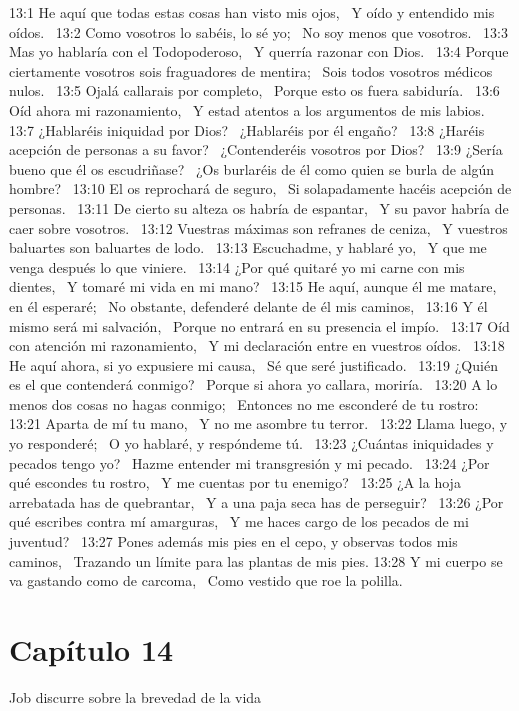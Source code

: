 13:1 He aquí que todas estas cosas han visto mis ojos,  
Y oído y entendido mis oídos.  
13:2 Como vosotros lo sabéis, lo sé yo;  
No soy menos que vosotros.  
13:3 Mas yo hablaría con el Todopoderoso,  
Y querría razonar con Dios.  
13:4 Porque ciertamente vosotros sois fraguadores de mentira;  
Sois todos vosotros médicos nulos.  
13:5 Ojalá callarais por completo,  
Porque esto os fuera sabiduría.  
13:6 Oíd ahora mi razonamiento,  
Y estad atentos a los argumentos de mis labios. 
13:7 ¿Hablaréis iniquidad por Dios?  
¿Hablaréis por él engaño?  
13:8 ¿Haréis acepción de personas a su favor?  
¿Contenderéis vosotros por Dios?  
13:9 ¿Sería bueno que él os escudriñase?  
¿Os burlaréis de él como quien se burla de algún hombre?  
13:10 El os reprochará de seguro,  
Si solapadamente hacéis acepción de personas.  
13:11 De cierto su alteza os habría de espantar,  
Y su pavor habría de caer sobre vosotros.  
13:12 Vuestras máximas son refranes de ceniza,  
Y vuestros baluartes son baluartes de lodo.  
13:13 Escuchadme, y hablaré yo,  
Y que me venga después lo que viniere.  
13:14 ¿Por qué quitaré yo mi carne con mis dientes,  
Y tomaré mi vida en mi mano?  
13:15 He aquí, aunque él me matare, en él esperaré;  
No obstante, defenderé delante de él mis caminos,  
13:16 Y él mismo será mi salvación,  
Porque no entrará en su presencia el impío.  
13:17 Oíd con atención mi razonamiento,  
Y mi declaración entre en vuestros oídos.  
13:18 He aquí ahora, si yo expusiere mi causa,  
Sé que seré justificado.  
13:19 ¿Quién es el que contenderá conmigo?  
Porque si ahora yo callara, moriría.  
13:20 A lo menos dos cosas no hagas conmigo;  
Entonces no me esconderé de tu rostro:  
13:21 Aparta de mí tu mano,  
Y no me asombre tu terror.  
13:22 Llama luego, y yo responderé;  
O yo hablaré, y respóndeme tú.  
13:23 ¿Cuántas iniquidades y pecados tengo yo?  
Hazme entender mi transgresión y mi pecado.  
13:24 ¿Por qué escondes tu rostro,  
Y me cuentas por tu enemigo?  
13:25 ¿A la hoja arrebatada has de quebrantar,  
Y a una paja seca has de perseguir?  
13:26 ¿Por qué escribes contra mí amarguras,  
Y me haces cargo de los pecados de mi juventud?  
13:27 Pones además mis pies en el cepo, y observas todos mis caminos,  
Trazando un límite para las plantas de mis pies. 
13:28 Y mi cuerpo se va gastando como de carcoma,  
Como vestido que roe la polilla. 
\section*{Capítulo 14}
Job discurre sobre la brevedad de la vida  

